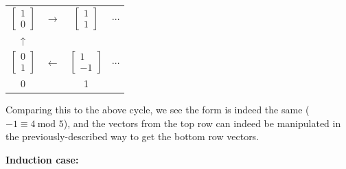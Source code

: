 \documentclass[a4paper, 12pt, reqno]{amsart}
\begin{document}
			\begin{tabular}{*{4}{c}}
				$\begin{bmatrix}
					1 \\
					0
				\end{bmatrix}$ &
				$\rightarrow$ &
				$\begin{bmatrix}
					1 \\
					1
				\end{bmatrix}$ &
				$\cdots$ \\
				$\uparrow$ &&& \\
				$\begin{bmatrix}
					0 \\
					1
				\end{bmatrix}$ &
				$\leftarrow$ &
				$\begin{bmatrix}
					1 \\
					-1
				\end{bmatrix}$ &
				$\cdots$ \\
				0 && 1 & 
			\end{tabular}
			
			Comparing this to the above cycle, we see the form is indeed the same ($-1 \equiv 4 \: \text{mod 5}$),
			and the vectors from the top row can indeed be manipulated in the previously-described way to get the
			bottom row vectors.
			
			\textbf{Induction case:}
			
\end{document}
